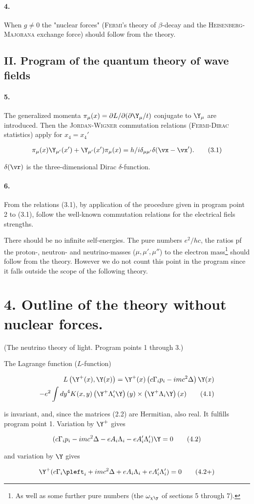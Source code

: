 \documentclass{article}
\newcommand{\nequ}[2]{
\begin{align*}
#1
\tag{#2}
\end{align*}
}
\begin{document}
\paragraph*{4.} When $g\neq 0$ the "nuclear forces" (\textsc{Fermi}'s theory of $\beta$-decay\cite{9} and the \textsc{Heisenberg-Majorana}\cite{10} exchange force) should follow from the theory.

\subsection*{II. Program of the quantum theory of wave fields}

\paragraph*{5.} The generalized momenta $\pi_\mu(x) = \partial L/\partial(\partial\Y_\mu/t)$ conjugate to $\Y_\mu$ are introduced. Then the \textsc{Jordan-Wigner} commutation relations\cite{11} (\textsc{Fermi-Dirac} statistics) apply for $x_4 = x_4'$
\nequ{
\pi_\mu(x)\Y_{\mu'}(x') + \Y_{\mu'}(x')\pi_{\mu}(x) = h/i \delta_{\mu\mu'}\delta(\vx - \vx').
}{3.1}
$\delta(\vr)$ is the three-dimensional Dirac $\delta$-function.

\paragraph*{6.} From the relations (3.1), by application of the procedure given in program point 2 to (3.1), follow the well-known commutation relations for the electrical fiels strengths\cite{12}.

There should be no infinite self-energies. The pure numbers $e^2/hc$, the ratios pf the proton-, neutron- and neutrino-masses ($\mu,\mu',\mu''$) to the electron mass\footnote{As well as some further pure numbers (the $\omega_{\chi\y}$ of sections 5 through 7).} should follow from the theory. However we do not count this point in the program since it falls outside the scope of the following theory.

\section*{4. Outline of the theory without nuclear forces.} (The neutrino theory of light. Program points 1 through 3.)

The Lagrange function ($L$-function)
\nequ{
L\left(\Y^+(x), \Y(x)\right) = \Y^+(x)\left(c\Gamma_i p_i - imc^2\Delta \right)\Y(x)\\
 - e^2 \int{dy}^4 K(x,y)\left(\Y^+ \Lambda_i' \Y \right)(y)\times\left(\Y^+\Lambda_i\Y\right)(x)
}{4.1}
is invariant, and, since the matrices (2.2) are Hermitian, also real. It fulfills program point 1. Variation by $\Y^+$ gives
\nequ{
(c\Gamma_i p_i - imc^2 \Delta - e A_i \Lambda_i - eA_i'\Lambda_i')\Y = 0
}{4.2}
and variation by $\Y$ gives
\nequ{
\Y^+(c\Gamma_i \pleft_i + imc^2 \Delta + e A_i \Lambda_i + eA_i'\Lambda_i') = 0
}{4.2+}
\end{document}
